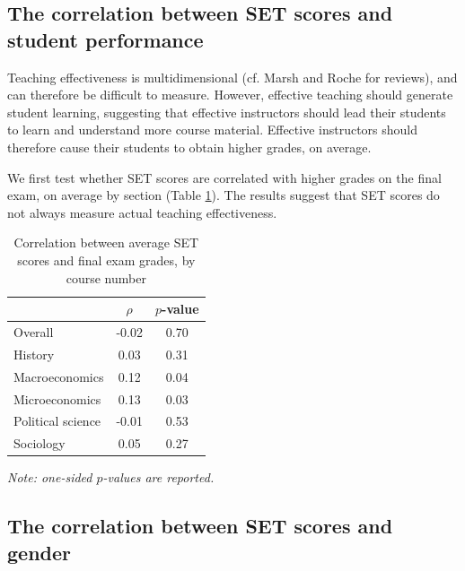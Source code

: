 \documentclass[12pt]{article}
\begin{document}
\subsection{The correlation between SET scores and student performance}

Teaching effectiveness is multidimensional (cf. Marsh and Roche for reviews), and can therefore be difficult to measure. However, effective teaching should generate student learning, suggesting that effective instructors should lead their students to learn and understand more course material. Effective instructors should therefore cause their students to obtain higher grades, on average. 

We first test whether SET scores are correlated with higher grades on the final exam, on average by section (Table \ref{tab:finalexam}). The results suggest that SET scores do not always measure actual teaching effectiveness. 

\begin{table}[htbp]
  \centering
  \footnotesize 
  \caption{Correlation between average SET scores and final exam grades, by course number}
    \begin{tabular}{lcc}
    \toprule 
                        & $\rho$  & $p$-value  \\
   \midrule
    Overall &            -0.02 &       0.70  \\
    History &             0.03 &       0.31  \\
    Macroeconomics &      0.12 &       0.04  \\
    Microeconomics &      0.13 &       0.03  \\
    Political science & -0.01 &       0.53  \\
    Sociology &           0.05 &       0.27  \\
    \bottomrule
    \end{tabular}%
 \label{tab:finalexam}%
 
  \textit{Note: one-sided $p$-values are reported.}
\end{table}%
\normalsize




\subsection{The correlation between SET scores and gender}
\end{document}
